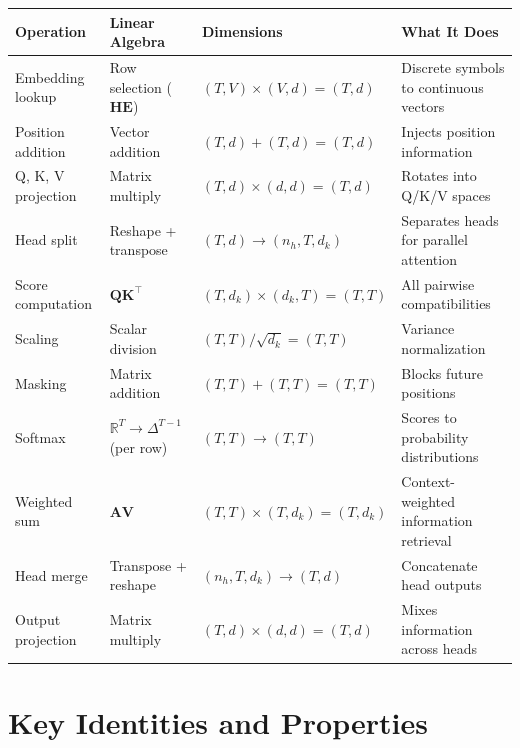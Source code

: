 \documentclass[11pt, a4paper]{article}
\newcommand{\R}{\mathbb{R}}
\newcommand{\mQ}{\bm{Q}}
\newcommand{\mK}{\bm{K}}
\newcommand{\mV}{\bm{V}}
\newcommand{\mE}{\bm{E}}
\newcommand{\mA}{\bm{A}}
\begin{document}
\begin{center}
\renewcommand{\arraystretch}{1.4}
\begin{tabular}{@{}p{3cm}p{3.5cm}p{3cm}p{4cm}@{}}
\toprule
\textbf{Operation} & \textbf{Linear Algebra} & \textbf{Dimensions} & \textbf{What It Does} \\
\midrule
Embedding lookup & Row selection ($\bm{H}\mE$) & $(T,V) \times (V,d) = (T,d)$ & Discrete symbols to continuous vectors \\
\addlinespace
Position addition & Vector addition & $(T,d) + (T,d) = (T,d)$ & Injects position information \\
\addlinespace
Q, K, V projection & Matrix multiply & $(T,d) \times (d,d) = (T,d)$ & Rotates into Q/K/V spaces \\
\addlinespace
Head split & Reshape + transpose & $(T,d) \to (n_h,T,d_k)$ & Separates heads for parallel attention \\
\addlinespace
Score computation & $\mQ\mK^\top$ & $(T,d_k) \times (d_k,T) = (T,T)$ & All pairwise compatibilities \\
\addlinespace
Scaling & Scalar division & $(T,T) / \sqrt{d_k} = (T,T)$ & Variance normalization \\
\addlinespace
Masking & Matrix addition & $(T,T) + (T,T) = (T,T)$ & Blocks future positions \\
\addlinespace
Softmax & $\R^T \to \Delta^{T-1}$ (per row) & $(T,T) \to (T,T)$ & Scores to probability distributions \\
\addlinespace
Weighted sum & $\mA\mV$ & $(T,T) \times (T,d_k) = (T,d_k)$ & Context-weighted information retrieval \\
\addlinespace
Head merge & Transpose + reshape & $(n_h,T,d_k) \to (T,d)$ & Concatenate head outputs \\
\addlinespace
Output projection & Matrix multiply & $(T,d) \times (d,d) = (T,d)$ & Mixes information across heads \\
\bottomrule
\end{tabular}
\end{center}

\section{Key Identities and Properties}
\end{document}
